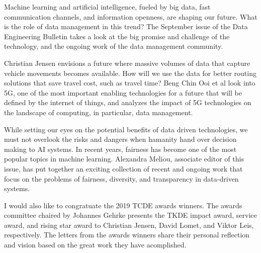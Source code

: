 \documentclass[11pt]{article}
\begin{document}
Machine learning and artificial intelligence, fueled by big data, fast
communication channels, and information openness, are shaping our
future. What is the role of data management in this trend?  The
September issue of the Data Engineering Bulletin takes a look at the
big promise and challenge of the technology, and the ongoing work of
the data management community.

Christian Jensen envisions a future where massive volumes of data that
capture vehicle movements becomes available. How will we use the data
for better routing solutions that save travel cost, such as travel
time?  Beng Chin Ooi et al look into 5G, one of the most important
enabling technologies for a future that will be defined by the
internet of things, and analyzes the impact of 5G technologies on the
landscape of computing, in particular, data management.

While setting our eyes on the potential benefits of data driven
technologies, we must not overlook the risks and dangers when hamanity
hand over decision making to AI systems. In recent years, fairness has
become one of the most popular topics in machine learning. Alexandra
Meliou, associate editor of this issue, has put together an exciting
collection of recent and ongoing work that focus on the problems of
fairness, diversity, and transparency in data-driven systems.

I would also like to congratuate the 2019 TCDE awards winners. The
awards committee chaired by Johannes Gehrke presents the TKDE impact
award, service award, and rising star award to Christian Jensen, David
Lomet, and Viktor Leis, respectively. The letters from the awards
winners share their personal reflection and vision based on the great
work they have acomplished.
\end{document}
